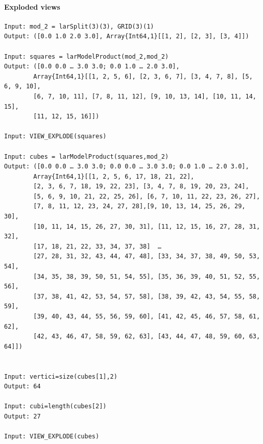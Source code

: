 \documentclass{article}
\begin{document}
\paragraph{Exploded views}
\begin{flushleft} \small
\begin{list}{}{} \item
   \begin{Verbatim}[tabsize=4]
Input: mod_2 = larSplit(3)(3), GRID(3)(1)
Output: ([0.0 1.0 2.0 3.0], Array{Int64,1}[[1, 2], [2, 3], [3, 4]])

Input: squares = larModelProduct(mod_2,mod_2)
Output: ([0.0 0.0 … 3.0 3.0; 0.0 1.0 … 2.0 3.0],
        Array{Int64,1}[[1, 2, 5, 6], [2, 3, 6, 7], [3, 4, 7, 8], [5, 6, 9, 10],
        [6, 7, 10, 11], [7, 8, 11, 12], [9, 10, 13, 14], [10, 11, 14, 15], 
        [11, 12, 15, 16]])

Input: VIEW_EXPLODE(squares)

Input: cubes = larModelProduct(squares,mod_2)
Output: ([0.0 0.0 … 3.0 3.0; 0.0 0.0 … 3.0 3.0; 0.0 1.0 … 2.0 3.0],
        Array{Int64,1}[[1, 2, 5, 6, 17, 18, 21, 22],
        [2, 3, 6, 7, 18, 19, 22, 23], [3, 4, 7, 8, 19, 20, 23, 24],
        [5, 6, 9, 10, 21, 22, 25, 26], [6, 7, 10, 11, 22, 23, 26, 27], 
        [7, 8, 11, 12, 23, 24, 27, 28],[9, 10, 13, 14, 25, 26, 29, 30],
        [10, 11, 14, 15, 26, 27, 30, 31], [11, 12, 15, 16, 27, 28, 31, 32],
        [17, 18, 21, 22, 33, 34, 37, 38]  … 
        [27, 28, 31, 32, 43, 44, 47, 48], [33, 34, 37, 38, 49, 50, 53, 54],
        [34, 35, 38, 39, 50, 51, 54, 55], [35, 36, 39, 40, 51, 52, 55, 56], 
        [37, 38, 41, 42, 53, 54, 57, 58], [38, 39, 42, 43, 54, 55, 58, 59],
        [39, 40, 43, 44, 55, 56, 59, 60], [41, 42, 45, 46, 57, 58, 61, 62], 
        [42, 43, 46, 47, 58, 59, 62, 63], [43, 44, 47, 48, 59, 60, 63, 64]])


Input: vertici=size(cubes[1],2)
Output: 64

Input: cubi=length(cubes[2])
Output: 27

Input: VIEW_EXPLODE(cubes)
   \end{Verbatim}
\end{list}
\end{flushleft}
\end{document}

